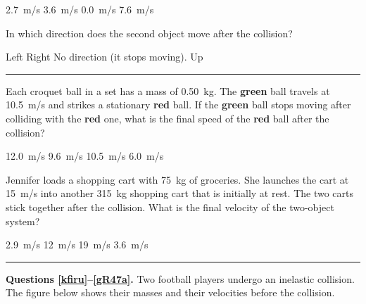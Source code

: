 \documentclass[../main-physics-problems.tex]{subfiles}
\begin{document}
\begin{questions}
\begin{randomizechoices}
\correctchoice \SI{2.7}{m/s}
\choice \SI{3.6}{m/s}
\choice \SI{0.0}{m/s}
\choice \SI{7.6}{m/s}
\end{randomizechoices}

 \question \label{last_question}
 In which direction does the second object move after the collision?

\begin{randomizechoices}
\correctchoice Left
\choice Right
\choice No direction (it stops moving).
\choice Up
\end{randomizechoices}

\bigskip

\hrule

\clearpage
\question
Each croquet ball in a set has a mass of \SI{0.50}{kg}. The \textbf{green} ball travels at \SI{10.5}{m/s} and strikes a stationary \textbf{red} ball. If the \textbf{green} ball stops moving after colliding with the \textbf{red} one, what is the final speed of the \textbf{red} ball after the collision?

\begin{randomizechoices}
\choice \SI{12.0}{m/s}
\choice \SI{9.6}{m/s}
\correctchoice \SI{10.5}{m/s}
\choice \SI{6.0}{m/s}
\end{randomizechoices}

\question 
Jennifer loads a shopping cart with \SI{75}{kg} of groceries. She launches the cart at \SI{15}{m/s} into another \SI{315}{kg} shopping cart that is initially at rest. The two carts stick together after the collision. What is the final velocity of the two-object system?

\begin{randomizechoices}
\correctchoice \SI{2.9}{m/s}
\choice \SI{12}{m/s}
\choice \SI{19}{m/s}
\choice \SI{3.6}{m/s}
\end{randomizechoices}

\bigskip

\hrule

\begin{EnvUplevel}
\textbf{Questions \ref{kfiru}--\ref{gR47a}.} Two football players undergo an inelastic collision. The figure below shows their masses and their velocities before the collision.
\end{EnvUplevel}



\end{questions}
\end{document}
